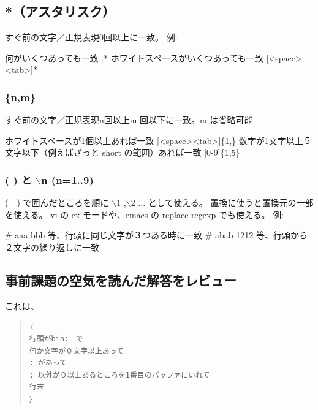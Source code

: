 \documentclass[mingoth,a4paper]{jsarticle}
\begin{document}
\subsection{*（アスタリスク）}

すぐ前の文字／正規表現0回以上に一致。
例:
\begin{commandline}
何がいくつあっても一致
  .* 
ホワイトスペースがいくつあっても一致
  [<space><tab>]* 
\end{commandline}

\subsubsection{\{n,m\}}

すぐ前の文字／正規表現n回以上m 回以下に一致。m は省略可能
\begin{commandline}
ホワイトスペースが1個以上あれば一致
[<space><tab>]\{1,\} 
数字が1文字以上５文字以下（例えばざっと short の範囲）あれば一致
[0-9]\{1,5\} 
\end{commandline}

\subsubsection{( ) と $\backslash$n (n=1..9)}

(　) で囲んだところを順に $\backslash$1 ,$\backslash$2 ... として使える。
置換に使うと置換元の一部を使える。
vi の ex モードや、emacs の replace regexp でも使える。 
例:
\begin{commandline}
# aaa bbb 等、行頭に同じ文字が３つある時に一致 
# abab 1212 等、行頭から２文字の繰り返しに一致 
\end{commandline}

\subsection{事前課題の空気を読んだ解答をレビュー}
これは、

 \begin{quote}
 \begin{verbatim}
｛
行頭がbin:　で
何か文字が０文字以上あって
: があって
: 以外が０以上あるところを1番目のバッファにいれて
行末
｝
 \end{verbatim}
 \end{quote}
\end{document}
